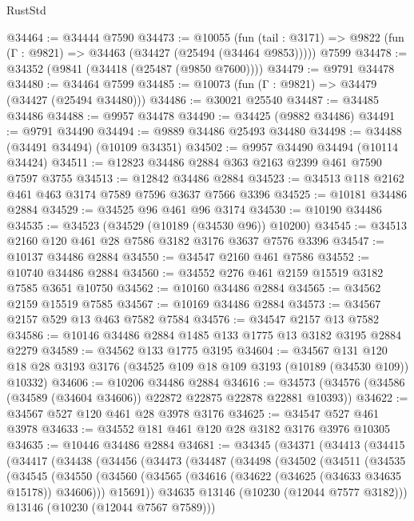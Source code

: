 \begin{lexlean}{RustStd}
\begin{coremodule}
@34464 := @34444 @7590
@34473 := @10055
    (fun (tail : @3171) => @9822 (fun (Γ : @9821) => @34463 (@34427 (@25494 (@34464 @9853)))))
    @7599
@34478 := @34352 (@9841 (@34418 (@25487 (@9850 @7600))))
@34479 := @9791 @34478
@34480 := @34464 @7599
@34485 := @10073 (fun (Γ : @9821) => @34479 (@34427 (@25494 @34480)))
@34486 := @30021 @25540
@34487 := @34485 @34486
@34488 := @9957 @34478
@34490 := @34425 (@9882 @34486)
@34491 := @9791 @34490
@34494 := @9889 @34486 @25493 @34480
@34498 := @34488 (@34491 @34494) (@10109 @34351)
@34502 := @9957 @34490 @34494 (@10114 @34424)
@34511 := @12823 @34486 @2884 @363 @2163 @2399 @461 @7590 @7597 @3755
@34513 := @12842 @34486 @2884
@34523 := @34513 @118 @2162 @461 @463 @3174 @7589 @7596 @3637 @7566 @3396
@34525 := @10181 @34486 @2884
@34529 := @34525 @96 @461 @96 @3174
@34530 := @10190 @34486
@34535 := @34523 (@34529 (@10189 (@34530 @96)) @10200)
@34545 := @34513 @2160 @120 @461 @28 @7586 @3182 @3176 @3637 @7576 @3396
@34547 := @10137 @34486 @2884
@34550 := @34547 @2160 @461 @7586
@34552 := @10740 @34486 @2884
@34560 := @34552 @276 @461 @2159 @15519 @3182 @7585 @3651 @10750
@34562 := @10160 @34486 @2884
@34565 := @34562 @2159 @15519 @7585
@34567 := @10169 @34486 @2884
@34573 := @34567 @2157 @529 @13 @463 @7582 @7584
@34576 := @34547 @2157 @13 @7582
@34586 := @10146 @34486 @2884 @1485 @133 @1775 @13 @3182 @3195 @2884 @2279
@34589 := @34562 @133 @1775 @3195
@34604 := @34567
    @131
    @120
    @18
    @28
    @3193
    @3176
    (@34525 @109 @18 @109 @3193 (@10189 (@34530 @109)) @10332)
@34606 := @10206 @34486 @2884
@34616 := @34573 (@34576 (@34586 (@34589 (@34604 @34606)) @22872 @22875 @22878 @22881 @10393))
@34622 := @34567 @527 @120 @461 @28 @3978 @3176
@34625 := @34547 @527 @461 @3978
@34633 := @34552 @181 @461 @120 @28 @3182 @3176 @3976 @10305
@34635 := @10446 @34486 @2884
@34681 := @34345
    (@34371
      (@34413
        (@34415
          (@34417
            (@34438
              (@34456
                (@34473
                  (@34487
                    (@34498
                      (@34502
                        (@34511
                          (@34535
                            (@34545
                              (@34550
                                (@34560
                                  (@34565 (@34616 (@34622 (@34625 (@34633 @34635 @15178)) @34606)))
                                  @15691))
                              @34635
                              @13146
                              (@10230 (@12044 @7577 @3182)))
                            @13146
                            (@10230 (@12044 @7567 @7589)))

\end{coremodule}
\end{lexlean}
